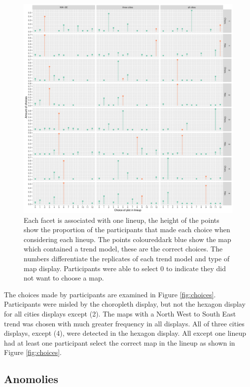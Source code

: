\documentclass[conference,final,]{IEEEtran}
\makeatletter
\def\maxwidth{\ifdim\Gin@nat@width>\linewidth\linewidth
\else\Gin@nat@width\fi}
\let\Oldincludegraphics\includegraphics
\renewcommand{\includegraphics}[1]{\Oldincludegraphics[width=\maxwidth]{#1}}
\makeatother
\begin{document}
\begin{figure}
\centering
\includegraphics{paper_files/figure-latex/choices-1.pdf}
\caption{Each facet is associated with one lineup, the height of the
points show the proportion of the participants that made each choice
when considering each lineup. The points coloureddark blue show the map
which contained a trend model, these are the correct choices. The
numbers differentiate the replicates of each trend model and type of map
display. Participants were able to select 0 to indicate they did not
want to choose a map.}
\end{figure}

The choices made by participants are examined in Figure
\ref{fig:choices}. Participants were misled by the choropleth display,
but not the hexagon display for all cities displays except (2). The maps
with a North West to South East trend was chosen with much greater
frequency in all displays. All of three cities displays, except (4),
were detected in the hexagon display. All except one lineup had at least
one participant select the correct map in the lineup as shown in Figure
\ref{fig:choices}.

\hypertarget{anomolies}{%
\subsection{Anomolies}\label{anomolies}}
\end{document}

